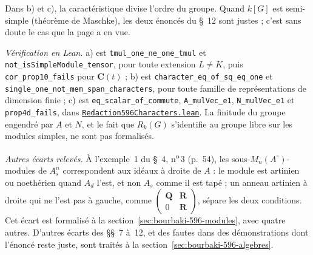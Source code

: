 \noindent Dans b) et c), la caractéristique divise l'ordre du groupe. Quand $k[G]$ est semi-simple (théorème de Maschke), les deux énoncés du §~12 sont justes ; c'est sans doute le cas que la page a en vue.

\begin{sloppypar}
\noindent\emph{Vérification en Lean.} a) est \texttt{tmul\_one\_ne\_one\_tmul} et \texttt{not\_isSimpleModule\_tensor}, pour toute extension $L \neq K$, puis \texttt{cor\_prop10\_fails} pour $\mathbf C(t)$ ; b) est \texttt{character\_eq\_of\_sq\_eq\_one} et \texttt{single\_one\_not\_mem\_span\_characters}, pour toute famille de représentations de dimension finie ; c) est \texttt{eq\_scalar\_of\_commute}, \texttt{A\_mulVec\_e1}, \texttt{N\_mulVec\_e1} et \texttt{prop4d\_fails}, dans \href{\leanblobmain/Redaction596Characters.lean}{\texttt{Redaction596\allowbreak{}Characters.\allowbreak{}lean}}. La finitude du groupe engendré par $A$ et $N$, et le fait que $R_k(G)$ s'identifie au groupe libre sur les modules simples, ne sont pas formalisés.
\end{sloppypar}

\emph{Autres écarts relevés.} À l'exemple~1 du §~4, n\textsuperscript{o}\,3 (p.~54), les sous-$M_n(A^{\circ})$-modules de $A_s^n$ correspondent aux idéaux à droite de $A$ : le module est artinien ou noethérien quand $A_d$ l'est, et non $A_s$ comme il est tapé ; un anneau artinien à droite qui ne l'est pas à gauche, comme $\left(\begin{smallmatrix} \mathbf Q & \mathbf R \\ 0 & \mathbf R \end{smallmatrix}\right)$, sépare les deux conditions. Cet écart est formalisé à la section~\ref{sec:bourbaki-596-modules}, avec quatre autres. D'autres écarts des §§~7 à~12, et des fautes dans des démonstrations dont l'énoncé reste juste, sont traités à la section~\ref{sec:bourbaki-596-algebres}.

